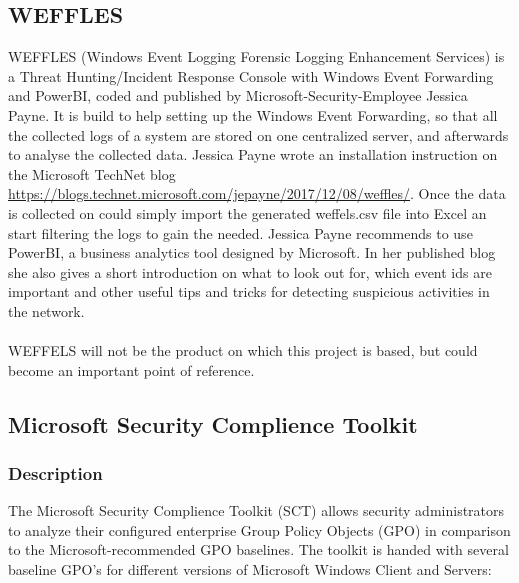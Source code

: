 \subsection{WEFFLES}
WEFFLES (Windows Event Logging Forensic Logging Enhancement Services) is a Threat Hunting/Incident Response Console with Windows Event Forwarding and PowerBI, coded and published by Microsoft-Security-Employee Jessica Payne. It is build to help setting up the Windows Event Forwarding, so that all the collected logs of a system are stored on one centralized server, and afterwards to analyse the collected data. Jessica Payne wrote an installation instruction on the Microsoft TechNet blog \url{https://blogs.technet.microsoft.com/jepayne/2017/12/08/weffles/}. Once the data is collected on could simply import the generated weffels.csv file into Excel an start filtering the logs to gain the needed. Jessica Payne recommends to use PowerBI, a business analytics tool designed by Microsoft. In her published blog she also gives a short introduction on what to look out for, which event ids are important and other useful tips and tricks for detecting suspicious activities in the network.\ \\
\ \\
WEFFELS will not be the product on which this project is based, but could become an important point of reference. 

\subsection{Microsoft Security Complience Toolkit}
\subsubsection{Description}
The Microsoft Security Complience Toolkit (SCT) \cite{SCT} allows security administrators to analyze their configured enterprise Group Policy Objects (GPO) in comparison to the Microsoft-recommended GPO baselines. The toolkit is handed with several baseline GPO's for different versions of Microsoft Windows Client and Servers:

